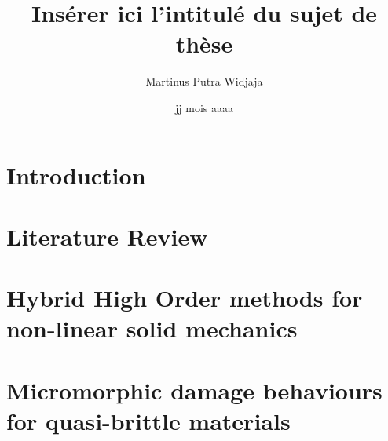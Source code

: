 \documentclass[a4paper, 11pt]{book}
\title{Insérer ici l'intitulé du sujet de thèse}
\author{Martinus Putra Widjaja}
\institute{MINES ParisTech}
\date{jj mois aaaa}
\begin{document}
\maketitle{}

\tableofcontents
\listoffigures

\chapter{Introduction}



\chapter{Literature Review}




\chapter{Hybrid High Order methods for non-linear solid mechanics}








\chapter{Micromorphic damage behaviours for quasi-brittle materials}








% 
% 
% 
\end{document}
